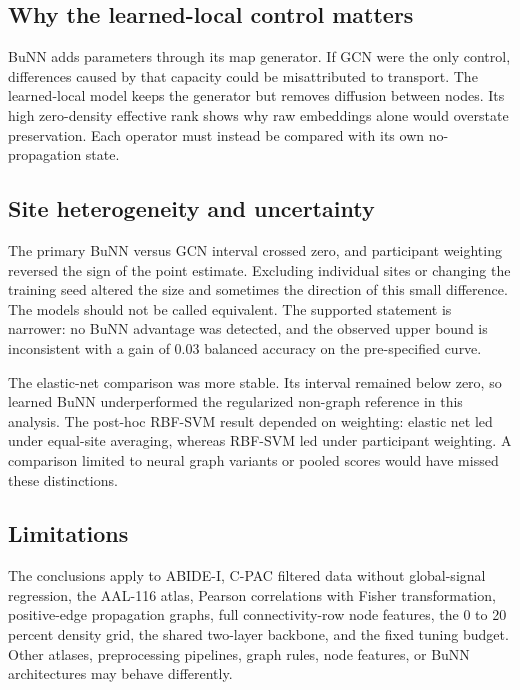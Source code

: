 \documentclass[11pt,a4paper]{article}
\begin{document}
\subsection{Why the learned-local control matters}

BuNN adds parameters through its map generator. If GCN were the only control,
differences caused by that capacity could be misattributed to transport. The
learned-local model keeps the generator but removes diffusion between nodes.
Its high zero-density effective rank shows why raw embeddings alone would
overstate preservation. Each operator must instead be compared with its own
no-propagation state.

\subsection{Site heterogeneity and uncertainty}

The primary BuNN versus GCN interval crossed zero, and participant weighting
reversed the sign of the point estimate. Excluding individual sites or changing
the training seed altered the size and sometimes the direction of this small
difference. The models should not be called equivalent. The supported statement
is narrower: no BuNN advantage was detected, and the observed upper bound is
inconsistent with a gain of 0.03 balanced accuracy on the pre-specified curve.

The elastic-net comparison was more stable. Its interval remained below zero,
so learned BuNN underperformed the regularized non-graph reference in this
analysis. The post-hoc RBF-SVM result depended on weighting: elastic net led
under equal-site averaging, whereas RBF-SVM led under participant weighting.
A comparison limited to neural graph variants or pooled scores would have
missed these distinctions.

\subsection{Limitations}

The conclusions apply to ABIDE-I, C-PAC filtered data without global-signal
regression, the AAL-116 atlas, Pearson correlations with Fisher transformation,
positive-edge propagation graphs, full connectivity-row node features, the 0
to 20 percent density grid, the shared two-layer backbone, and the fixed tuning
budget. Other atlases, preprocessing pipelines, graph rules, node features, or
BuNN architectures may behave differently.
\end{document}

